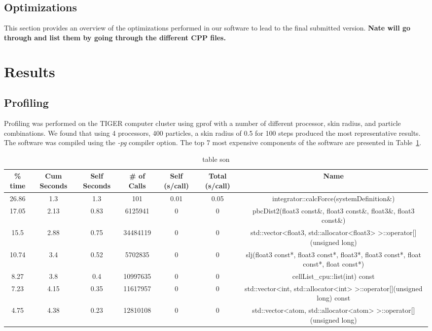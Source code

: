 \documentclass[12pt]{article}
\begin{document}
\subsection{Optimizations}
This section provides an overview of the optimizations performed in our software to lead to the final submitted version.
\textbf{Nate will go through and list them by going through the different CPP files.}
\section{Results}

\subsection{Profiling}

Profiling was performed on the TIGER computer cluster using gprof with a number of different processor, skin radius, and particle combinations. We found that using 4 processors, 400 particles, a skin radius of 0.5 for 100 steps produced the most representative results. The software was compiled using the \textit{-pg} compiler option. The top 7 most expensive components of the software are presented in Table~\ref{tab:profiling}.

\begin{table}[htbp]
  \centering
  \tiny
  \caption{table son}
    \begin{tabular}{ccccccc}
    \toprule
    \% time & Cum Seconds & Self Seconds & \# of Calls & Self (s/call) & Total (s/call) & Name \\
    \midrule
    26.86 & 1.3   & 1.3   & 101   & 0.01  & 0.05  & integrator::calcForce(systemDefinition\&) \\
    17.05 & 2.13  & 0.83  & 6125941 & 0     & 0     & pbcDist2(float3 const\&, float3 const\&, float3\&, float3 const\&) \\
    15.5  & 2.88  & 0.75  & 34484119 & 0     & 0     & std::vector<float3, std::allocator<float3> >::operator[](unsigned long) \\
    10.74 & 3.4   & 0.52  & 5702835 & 0     & 0     & slj(float3 const*, float3 const*, float3*, float3 const*, float const*, float const*) \\
    8.27  & 3.8   & 0.4   & 10997635 & 0     & 0     & cellList\_cpu::list(int) const \\
    7.23  & 4.15  & 0.35  & 11617957 & 0     & 0     & std::vector<int, std::allocator<int> >::operator[](unsigned long) const \\
    4.75  & 4.38  & 0.23  & 12810108 & 0     & 0     & std::vector<atom, std::allocator<atom> >::operator[](unsigned long) \\
    \bottomrule
    \end{tabular}%
  \label{tab:profiling}%
\end{table}%
\end{document}
